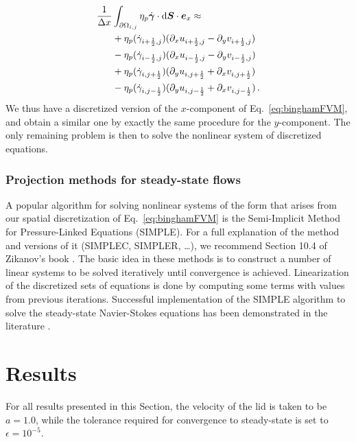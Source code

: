 \documentclass[final,3p,twocolumn]{elsarticle}
\begin{document}
\begin{align}
    \nonumber 
    \frac{1}{\Delta x} &\int_{\partial \Omega_{i,j}} \eta_p \dot{\bm{\gamma}}
    \cdot {\rm d}\bm{S} \cdot \bm{e}_x \approx \\ 
    \nonumber 
    &+ \eta_p (\dot{\gamma}_{i+\frac{1}{2},j}) (\partial_x
    u_{i+\frac{1}{2},j} - \partial_y v_{i+\frac{1}{2},j}) \\
    \nonumber 
    &- \eta_p (\dot{\gamma}_{i-\frac{1}{2},j}) (\partial_x
    u_{i-\frac{1}{2},j} - \partial_y v_{i-\frac{1}{2},j}) \\
    \nonumber 
    &+ \eta_p (\dot{\gamma}_{i,j+\frac{1}{2}}) (\partial_y
    u_{i,j+\frac{1}{2}} + \partial_x v_{i,j+\frac{1}{2}}) \\
    &- \eta_p (\dot{\gamma}_{i,j-\frac{1}{2}}) (\partial_y
    u_{i,j-\frac{1}{2}} + \partial_x v_{i,j-\frac{1}{2}}) \,.
\end{align}
%
We thus have a discretized version of the $x$-component of Eq.\
\eqref{eq:binghamFVM}, and obtain a similar one by exactly the same procedure
for the $y$-component. The only remaining problem is then to solve the
nonlinear system of discretized equations. 

\subsubsection{Projection methods for steady-state flows}

A popular algorithm for solving nonlinear systems of the form that arises from
our spatial discretization of Eq.\ \eqref{eq:binghamFVM} is the Semi-Implicit
Method for Pressure-Linked Equations (SIMPLE). For a full explanation of the
method and versions of it (SIMPLEC, SIMPLER, \ldots), we recommend Section 10.4
of Zikanov's book \cite{zikanov2010essential}. The basic idea in these methods
is to construct a number of linear systems to be solved iteratively until
convergence is achieved. Linearization of the discretized sets of equations is
done by computing some terms with values from previous iterations.  Successful
implementation of the SIMPLE algorithm to solve the steady-state Navier-Stokes
equations has been demonstrated in the literature \cite{syrakos2013solution}.

\section{Results}
\label{sec:results}

For all results presented in this Section, the velocity of the lid is taken to
be $a=1.0$, while the tolerance required for convergence to steady-state is set
to $\epsilon=10^{-5}$. 
\end{document}
